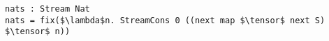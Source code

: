 \begin{lstlisting}[mathescape]
nats : Stream Nat
nats = fix($\lambda$n. StreamCons 0 ((next map $\tensor$ next S) $\tensor$ n))
\end{lstlisting}
